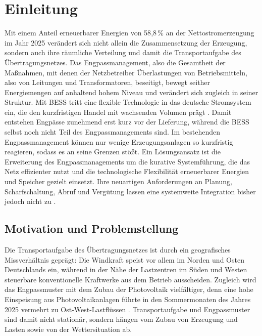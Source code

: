 \chapter{Einleitung}
\label{ch:intro}

Mit einem Anteil erneuerbarer Energien von 58{,}8\,\% an der Nettostromerzeugung im Jahr 2025 \cite{bundesnetzagentur_strommarktdaten_2026} verändert sich nicht allein die Zusammensetzung der Erzeugung, sondern auch ihre räumliche Verteilung und damit die Transportaufgabe des Übertragungsnetzes.
Das Engpassmanagement, also die Gesamtheit der Maßnahmen, mit denen der Netzbetreiber Überlastungen von Betriebsmitteln, also von Leitungen und Transformatoren, beseitigt, bewegt seither Energiemengen auf anhaltend hohem Niveau und verändert sich zugleich in seiner Struktur.
Mit \ac{BESS} tritt eine flexible Technologie in das deutsche Stromsystem ein, die den kurzfristigen Handel mit wachsenden Volumen prägt \cite{garttan_battery_2025}.
Damit entstehen Engpässe zunehmend erst kurz vor der Lieferung, während die \ac{BESS} selbst noch nicht Teil des Engpassmanagements sind.
Im bestehenden Engpassmanagement können nur wenige Erzeugungsanlagen so kurzfristig reagieren, sodass es an seine Grenzen stößt.
Ein Lösungsansatz ist die Erweiterung des Engpassmanagements um die kurative Systemführung, die das Netz effizienter nutzt und die technologische Flexibilität erneuerbarer Energien und Speicher gezielt einsetzt.
Ihre neuartigen Anforderungen an Planung, Scharfschaltung, Abruf und Vergütung lassen eine systemweite Integration bisher jedoch nicht zu \cite{innosys_2030_gesamtverbund_innovationen_2021}.

\section{Motivation und Problemstellung}
\label{sec:motivation}

Die Transportaufgabe des Übertragungsnetzes ist durch ein geografisches Missverhältnis geprägt: Die Windkraft speist vor allem im Norden und Osten Deutschlands ein, während in der Nähe der Lastzentren im Süden und Westen steuerbare konventionelle Kraftwerke aus dem Betrieb ausscheiden.
Zugleich wird das Engpassmuster mit dem Zubau der Photovoltaik vielfältiger, denn eine hohe Einspeisung aus Photovoltaikanlagen führte in den Sommermonaten des Jahres 2025 vermehrt zu Ost-West-Lastflüssen \cite{bundesnetzagentur_smard_engpassmanagement_2026}.
Transportaufgabe und Engpassmuster sind damit nicht stationär, sondern hängen vom Zubau von Erzeugung und Lasten sowie von der Wettersituation ab.

